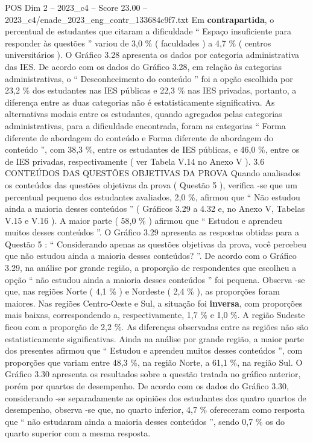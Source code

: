 \begin{textsample}{POS Dim 2 – 2023\_c4 – Score 23.00 – 2023\_c4/enade\_2023\_eng\_contr\_133684c9f7.txt}
Em \textbf{contrapartida}, o percentual de estudantes que citaram a dificuldade “ Espaço insuficiente para responder às questões ” variou de 3,0 \% ( faculdades ) a 4,7 \% ( centros universitários ).
O Gráfico 3.28 apresenta os dados por categoria administrativa das IES.
De acordo com os dados do Gráfico 3.28, em relação às categorias administrativas, o “ Desconhecimento do conteúdo ” foi a opção escolhida por 23,2 \% dos estudantes nas IES públicas e 22,3 \% nas IES privadas, portanto, a diferença entre as duas categorias não é estatisticamente significativa.
As alternativas modais entre os estudantes, quando agregados pelas categorias administrativas, para a dificuldade encontrada, foram as categorias “ Forma diferente de abordagem do conteúdo e Forma diferente de abordagem do conteúdo ”, com 38,3 \%, entre os estudantes de IES públicas, e 46,0 \%, entre os de IES privadas, respectivamente ( ver Tabela V.14 no Anexo V ). 3.6 CONTEÚDOS DAS QUESTÕES OBJETIVAS DA PROVA Quando analisados os conteúdos das questões objetivas da prova ( Questão 5 ), verifica -se que um percentual pequeno dos estudantes avaliados, 2,0 \%, afirmou que “ Não estudou ainda a maioria desses conteúdos ” ( Gráficos 3.29 a 4.32 e, no Anexo V, Tabelas V.15 e V.16 ).
A maior parte ( 58,0 \% ) afirmou que “ Estudou e aprendeu muitos desses conteúdos ”.
O Gráfico 3.29 apresenta as respostas obtidas para a Questão 5 : “ Considerando apenas as questões objetivas da prova, você percebeu que não estudou ainda a maioria desses conteúdos? ”.
De acordo com o Gráfico 3.29, na análise por grande região, a proporção de respondentes que escolheu a opção “ não estudou ainda a maioria desses conteúdos ” foi pequena.
Observa -se que, nas regiões Norte ( 4,1 \% ) e Nordeste ( 2,4 \% ), as proporções foram maiores.
Nas regiões Centro-Oeste e Sul, a situação foi \textbf{inversa}, com proporções mais baixas, correspondendo a, respectivamente, 1,7 \% e 1,0 \%.
A região Sudeste ficou com a proporção de 2,2 \%.
As diferenças observadas entre as regiões não são estatisticamente significativas.
Ainda na análise por grande região, a maior parte dos presentes afirmou que “ Estudou e aprendeu muitos desses conteúdos ”, com proporções que variam entre 48,3 \%, na região Norte, a 61,1 \%, na região Sul.
O Gráfico 3.30 apresenta os resultados sobre a questão tratada no gráfico anterior, porém por quartos de desempenho.
De acordo com os dados do Gráfico 3.30, considerando -se separadamente as opiniões dos estudantes dos quatro quartos de desempenho, observa -se que, no quarto inferior, 4,7 \% ofereceram como resposta que “ não estudaram ainda a maioria desses conteúdos ”, sendo 0,7 \% os do quarto superior com a mesma resposta.

\end{textsample}
